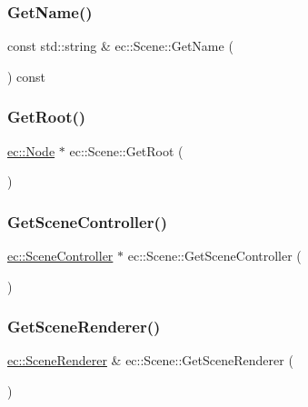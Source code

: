 \subsubsection{\texorpdfstring{Get\+Name()}{GetName()}}
{\footnotesize\ttfamily const std\+::string \& ec\+::\+Scene\+::\+Get\+Name (\begin{DoxyParamCaption}{ }\end{DoxyParamCaption}) const}

\mbox{\label{classec_1_1_scene_aa2c014fb59f0b51abe5de601a93297d5}} 
\subsubsection{\texorpdfstring{Get\+Root()}{GetRoot()}}
{\footnotesize\ttfamily \mbox{\hyperlink{classec_1_1_node}{ec\+::\+Node}} $\ast$ ec\+::\+Scene\+::\+Get\+Root (\begin{DoxyParamCaption}{ }\end{DoxyParamCaption})}

\mbox{\label{classec_1_1_scene_ac3e1522d93014a5f19193cc3d173d64a}} 
\subsubsection{\texorpdfstring{Get\+Scene\+Controller()}{GetSceneController()}}
{\footnotesize\ttfamily \mbox{\hyperlink{classec_1_1_scene_controller}{ec\+::\+Scene\+Controller}} $\ast$ ec\+::\+Scene\+::\+Get\+Scene\+Controller (\begin{DoxyParamCaption}{ }\end{DoxyParamCaption})}

\mbox{\label{classec_1_1_scene_a79d67056a8b73bf78e37e5d8951363f5}} 
\subsubsection{\texorpdfstring{Get\+Scene\+Renderer()}{GetSceneRenderer()}}
{\footnotesize\ttfamily \mbox{\hyperlink{classec_1_1_scene_renderer}{ec\+::\+Scene\+Renderer}} \& ec\+::\+Scene\+::\+Get\+Scene\+Renderer (\begin{DoxyParamCaption}{ }\end{DoxyParamCaption})}

